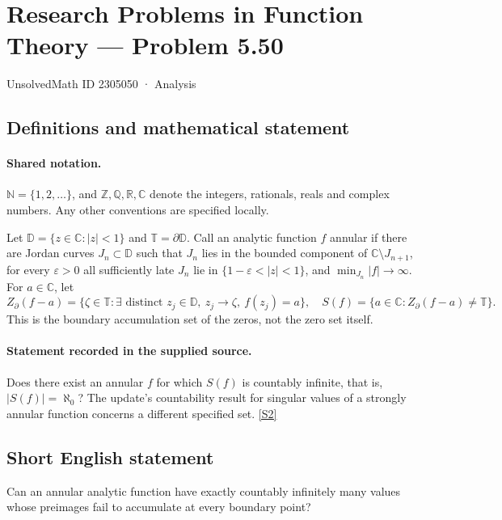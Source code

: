 \documentclass[11pt]{book}
\newcommand{\sref}[2]{\hyperlink{source:#1:#2}{[S#2]}}
\begin{document}
\setcounter{section}{2305049}
\section{Research Problems in Function Theory — Problem 5.50}\label{2305050}
{\small\sffamily UnsolvedMath ID 2305050 · Analysis}
\subsection{Definitions and mathematical statement}

\paragraph{Shared notation.}$\mathbb N=\{1,2,\ldots\}$, and $\mathbb Z,\mathbb Q,\mathbb R,\mathbb C$ denote the integers, rationals, reals and complex numbers. Any other conventions are specified locally.


Let $\mathbb D=\{z\in\mathbb C:|z|<1\}$ and $\mathbb T=\partial\mathbb D$. Call an analytic function $f$ annular if there are Jordan curves $J_n\subset\mathbb D$ such that $J_n$ lies in the bounded component of $\mathbb C\setminus J_{n+1}$, for every $\varepsilon>0$ all sufficiently late $J_n$ lie in $\{1-\varepsilon<|z|<1\}$, and $\min_{J_n}|f|\to\infty$. For $a\in\mathbb C$, let \[Z_{\partial}(f-a)=\{\zeta\in\mathbb T:\exists\text{ distinct }z_j\in\mathbb D,\ z_j\to\zeta,\ f(z_j)=a\},\quad S(f)=\{a\in\mathbb C:Z_{\partial}(f-a)\ne\mathbb T\}.\] This is the boundary accumulation set of the zeros, not the zero set itself.
\paragraph{Statement recorded in the supplied source.}
Does there exist an annular $f$ for which $S(f)$ is countably infinite, that is, $|S(f)|=\aleph_0$? The update’s countability result for singular values of a strongly annular function concerns a different specified set. \sref{2305050}{2}
\subsection{Short English statement}
Can an annular analytic function have exactly countably infinitely many values whose preimages fail to accumulate at every boundary point?
\end{document}
